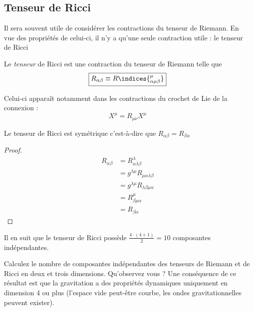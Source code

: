 \subsection{Tenseur de Ricci}
Il sera souvent utile de considérer les contractions du tenseur de Riemann. En vue des propriétés de celui-ci, il n'y a qu'une seule contraction utile : le tenseur de Ricci
\begin{theoremframe}
    \begin{defi}
        Le \emph{tenseur} de Ricci est une contraction du tenseur de Riemann telle que 
        \begin{equation}
            \boxed{R_{\alpha \beta} \equiv R\indices{^{\mu}_{\alpha \mu \beta }}}
        \end{equation}
    \end{defi}
\end{theoremframe}
Celui-ci apparaît notamment dans les contractions du crochet de Lie de la connexion :
\begin{equation}
    [\nabla_\mu,\nabla_\nu] X^\mu = R_{\mu \nu} X^\mu
\end{equation}
\begin{theoremframe}
    \begin{propri}
        Le tenseur de Ricci est symétrique c'est-à-dire que $R_{\alpha \beta} = R_{\beta \alpha}$
    \end{propri}
\end{theoremframe}
\begin{proof}
    \begin{align}
        R_{\alpha \beta} &= R^{\lambda}_{\alpha \lambda \beta }\\
        &= g^{\lambda \mu}R_{\mu \alpha \lambda \beta}\\
        &= g^{\lambda \mu}R_{ \lambda \beta \mu \alpha}\\
        &= R^{\mu}_{\beta \mu \alpha }\\
        &= R_{\beta \alpha}
    \end{align}
\end{proof}
Il en suit que le tenseur de Ricci possède $\frac{4 \cdot (4+1)}{2} = 10$ composantes indépendantes.
\begin{exerc}
    Calculez le nombre de composantes indépendantes des tenseurs de Riemann et de Ricci en deux et trois dimensions. Qu'observez vous ? Une conséquence de ce résultat est que la gravitation a des propriétés dynamiques uniquement en dimension 4 ou plus (l'espace vide peut-être courbe, les ondes gravitationnelles peuvent exister).
\end{exerc}
